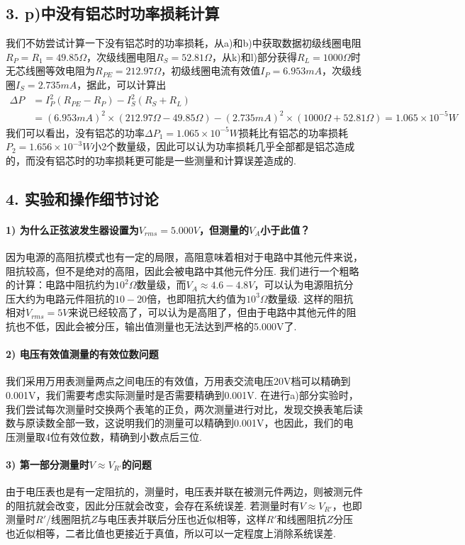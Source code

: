 \documentclass[UTF8]{ctexart}
\begin{document}
\subsection*{3. p)中没有铝芯时功率损耗计算}
我们不妨尝试计算一下没有铝芯时的功率损耗，从a)和b)中获取数据初级线圈电阻$R_P=R_1=49.85\Omega$，次级线圈电阻$R_S=52.81\Omega$，从k)和l)部分获得$R_L=1000\Omega$时无芯线圈等效电阻为$R_{PE}=212.97\Omega$，初级线圈电流有效值$I_P=6.953mA$，次级线圈$I_S=2.735mA$，据此，可以计算出
$$
\begin{aligned}
    \Delta P&=I_P^2(R_{PE}-R_P)-I_S^2(R_S+R_L)\\
    &=(6.953mA)^2\times(212.97\Omega-49.85\Omega)-(2.735mA)^2\times(1000\Omega+52.81\Omega)=1.065\times 10^{-5}W
\end{aligned}
$$
我们可以看出，没有铝芯的功率$\Delta P_{1}=1.065\times 10^{-5}W$损耗比有铝芯的功率损耗$P_2=1.656\times 10^{-3}W$小2个数量级，因此可以认为功率损耗几乎全部都是铝芯造成的，而没有铝芯时的功率损耗更可能是一些测量和计算误差造成的.

\subsection*{4. 实验和操作细节讨论}
\paragraph{1) 为什么正弦波发生器设置为$V_{rms}=5.000V$，但测量的$V_A$小于此值？}
因为电源的高阻抗模式也有一定的局限，高阻意味着相对于电路中其他元件来说，阻抗较高，但不是绝对的高阻，因此会被电路中其他元件分压. 我们进行一个粗略的计算：电路中阻抗约为$10^2\Omega$数量级，而$V_A\approx 4.6-4.8V$，可以认为电源阻抗分压大约为电路元件阻抗的$10-20$倍，也即阻抗大约值为$10^3\Omega$数量级. 这样的阻抗相对$V_{rms}=5V$来说已经较高了，可以认为是高阻了，但由于电路中其他元件的阻抗也不低，因此会被分压，输出值测量也无法达到严格的5.000V了.
\paragraph{2) 电压有效值测量的有效位数问题}
我们采用万用表测量两点之间电压的有效值，万用表交流电压20V档可以精确到0.001V，我们需要考虑实际测量时是否需要精确到0.001V. 在进行a)部分实验时，我们尝试每次测量时交换两个表笔的正负，两次测量进行对比，发现交换表笔后读数与原读数全部一致，这说明我们的测量可以精确到0.001V，也因此，我们的电压测量取4位有效位数，精确到小数点后三位.

\paragraph{3) 第一部分测量时$V\approx V_{R'}$的问题}
由于电压表也是有一定阻抗的，测量时，电压表并联在被测元件两边，则被测元件的阻抗就会改变，因此分压就会改变，会存在系统误差. 若测量时有$V\approx V_{R'}$，也即测量时$R'$/线圈阻抗$Z$与电压表并联后分压也近似相等，这样$R'$和线圈阻抗$Z$分压也近似相等，二者比值也更接近于真值，所以可以一定程度上消除系统误差.
\end{document}
